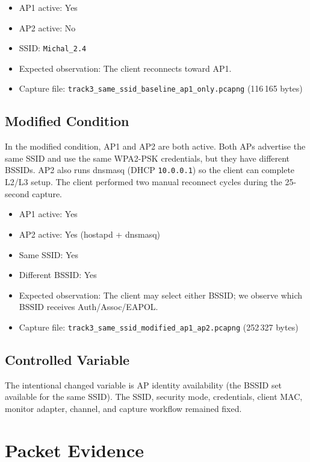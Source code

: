 \documentclass[12pt,a4paper]{article}
\begin{document}
\begin{itemize}
    \item AP1 active: Yes
    \item AP2 active: No
    \item SSID: \texttt{Michal\_2.4}
    \item Expected observation: The client reconnects toward AP1.
    \item Capture file: \texttt{track3\_same\_ssid\_baseline\_ap1\_only.pcapng} (116\,165 bytes)
\end{itemize}

\subsection{Modified Condition}

In the modified condition, AP1 and AP2 are both active. Both APs advertise the same SSID and use the same WPA2-PSK credentials, but they have different BSSIDs. AP2 also runs dnsmasq (DHCP \texttt{10.0.0.1}) so the client can complete L2/L3 setup. The client performed two manual reconnect cycles during the 25-second capture.

\begin{itemize}
    \item AP1 active: Yes
    \item AP2 active: Yes (hostapd + dnsmasq)
    \item Same SSID: Yes
    \item Different BSSID: Yes
    \item Expected observation: The client may select either BSSID; we observe which BSSID receives Auth/Assoc/EAPOL.
    \item Capture file: \texttt{track3\_same\_ssid\_modified\_ap1\_ap2.pcapng} (252\,327 bytes)
\end{itemize}

\subsection{Controlled Variable}

The intentional changed variable is AP identity availability (the BSSID set available for the same SSID). The SSID, security mode, credentials, client MAC, monitor adapter, channel, and capture workflow remained fixed.

\section{Packet Evidence}
\end{document}
